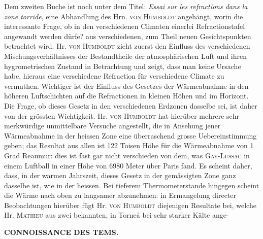 Dem zweiten Buche ist noch unter dem Titel: \emph{Essai sur les refractions dans la zone torride}, eine Abhandlung des Hrn. \textsc{von Humboldt} angehängt, worin die interessante Frage, ob in den verschiedenen Climaten einerlei Refractionstafel angewandt werden dürfe? aus verschiedenen, zum Theil neuen Gesichtspunkten betrachtet wird. Hr. \textsc{von Humboldt} zieht zuerst den Einfluss des verschiedenen Mischungsverhältnisses der Bestandtheile der atmosphärischen Luft und ihren hygrometrischen Zustand in Betrachtung und zeigt, dass man keine Ursache habe, hieraus eine verschiedene Refraction für verschiedene Climate zu vermuthen. Wichtiger ist der Einfluss des Gesetzes der Wärmeabnahme in den höheren Luftschichten auf die Refractionen in kleinen Höhen und im Horizont. Die Frage, ob dieses Gesetz in den verschiedenen Erdzonen dasselbe sei, ist daher von der grössten Wichtigkeit. Hr. \textsc{von Humboldt} hat hierüber mehrere sehr merkwürdige unmittelbare Versuche angestellt, die in Ansehung jener Wärmeabnahme in der heissen Zone eine überraschend grosse Uebereinstimmung geben; das Resultat aus allen ist 122 Toisen Höhe für die Wärmeabnahme von 1 Grad Reaumur: dies ist fast gar nicht verschieden von dem, was \textsc{Gay-Lussac} in einem Luftball in einer Höhe von 6980 Meter über Paris fand. Es scheint daher, dass, in der warmen Jahrszeit, dieses Gesetz in der gemässigten Zone ganz dasselbe ist, wie in der heissen. Bei tieferem Thermometerstande hingegen scheint die Wärme nach oben zu langsamer abzunehmen: in Ermangelung directer Beobachtungen hierüber fügt Hr. \textsc{von Humboldt} diejenigen Resultate bei, welche Hr. \textsc{Mathieu} aus zwei bekannten, in Torneå bei sehr starker Kälte ange-\par
\clearpage
\endgroup
\begingroup
\pagestyle{empty}
\newcommand{\GaussVIGathering}[2]{%
  \fancypagestyle{gaussVIGathering}{%
    \fancyhf{}%
    \renewcommand{\headrulewidth}{0pt}%
    \renewcommand{\footrulewidth}{0pt}%
    \fancyfoot[C]{\makebox[\textwidth][l]{%
      \hspace*{.025\textwidth}{\footnotesize\bfseries #1}\hfill
      {\normalsize\bfseries\textls[90]{#2}}\hspace*{.18\textwidth}}}%
  }%
  \thispagestyle{gaussVIGathering}%
}
\noindent{}%
\makebox[12mm][l]{}%
\parbox[t]{\dimexpr\linewidth-24mm\relax}{\centering\footnotesize\bfseries CONNOISSANCE DES TEMS.\par}%
\par\nobreak\medskip
